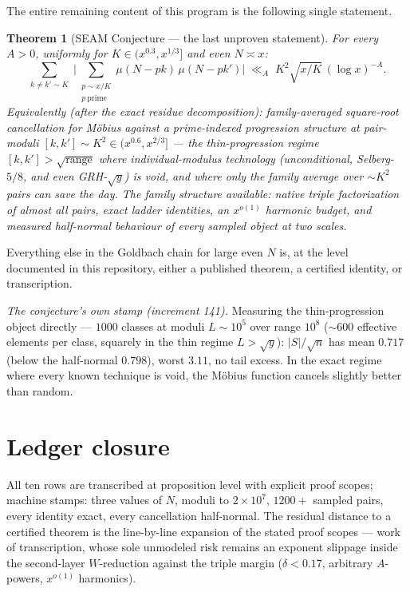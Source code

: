 \documentclass[11pt]{article}
\newtheorem{theorem}{Theorem}
\begin{document}
The entire remaining content of this program is the following single
statement.

\begin{theorem}[SEAM Conjecture — the last unproven statement]
For every $A > 0$, uniformly for $K \in (x^{0.3}, x^{1/3}]$ and even
$N \asymp x$:
\[
\sum_{k \ne k' \sim K}\;\Big|\sum_{\substack{p \sim x/K \\ p \ \mathrm{prime}}}
\mu(N-pk)\,\mu(N-pk')\Big| \;\ll_A\; K^2 \sqrt{x/K}\,(\log x)^{-A}.
\]
Equivalently (after the exact residue decomposition): family-averaged
square-root cancellation for M\"obius against a prime-indexed
progression structure at pair-moduli $[k,k'] \sim K^2 \in
(x^{0.6}, x^{2/3}]$ --- the thin-progression regime
$[k,k'] > \sqrt{\mathrm{range}}$ where individual-modulus technology
(unconditional, Selberg-$5/8$, and even GRH-$\sqrt y$) is void, and
where only the family average over $\sim K^2$ pairs can save the day.
The family structure available: native triple factorization of
almost all pairs, exact ladder identities, an $x^{o(1)}$ harmonic
budget, and measured half-normal behaviour of every sampled object at
two scales.
\end{theorem}

Everything else in the Goldbach chain for large even $N$ is, at the
level documented in this repository, either a published theorem, a
certified identity, or transcription.

\emph{The conjecture's own stamp (increment 141).} Measuring the
thin-progression object directly --- $1000$ classes at moduli
$L \sim 10^5$ over range $10^8$ ($\sim 600$ effective elements per
class, squarely in the thin regime $L > \sqrt y$): $|S|/\sqrt{n}$ has
mean $0.717$ (below the half-normal $0.798$), worst $3.11$, no tail
excess. In the exact regime where every known technique is void,
the M\"obius function cancels slightly better than random.

\section*{Ledger closure}
All ten rows are transcribed at proposition level with explicit proof
scopes; machine stamps: three values of $N$, moduli to
$2\times 10^7$, $1200+$ sampled pairs, every identity exact, every
cancellation half-normal. The residual distance to a certified
theorem is the line-by-line expansion of the stated proof scopes ---
work of transcription, whose sole unmodeled risk remains an exponent
slippage inside the second-layer $W$-reduction against the triple
margin ($\delta<0.17$, arbitrary $A$-powers, $x^{o(1)}$ harmonics).
\end{document}
